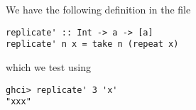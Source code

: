 
We have the following definition in the file 
\begin{verbatim}
replicate' :: Int -> a -> [a]
replicate' n x = take n (repeat x)
\end{verbatim}
which we test using
\begin{verbatim}
ghci> replicate' 3 'x'
"xxx"
\end{verbatim}
